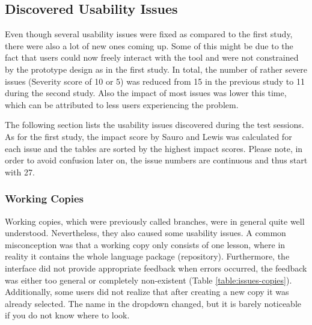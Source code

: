 \subsection{Discovered Usability Issues}
Even though several usability issues were fixed as compared to the first study, there were also a lot of new ones coming up. Some of this might be due to the fact that users could now freely interact with the tool and were not constrained by the prototype design as in the first study. In total, the number of rather severe issues (Severity score of 10 or 5)  was reduced from 15 in the previous study to 11 during the second study. Also the impact of most issues was lower this time, which can be attributed to less users experiencing the problem.

The following section lists the usability issues discovered during the test sessions. As for the first study, the impact score by Sauro and Lewis \cite{sauro_quantifying_2012} was calculated for each issue and the tables are sorted by the highest impact scores. Please note, in order to avoid confusion later on, the issue numbers are continuous and thus start with 27.


\subsubsection{Working Copies}
Working copies, which were previously called branches, were in general quite well understood. Nevertheless, they also caused some usability issues. A common misconception was that a working copy only consists of one lesson, where in reality it contains the whole language package (repository).
Furthermore, the interface did not provide appropriate feedback when errors occurred, the feedback was either too general or completely non-existent (Table \ref{table:issues-copies}). Additionally, some users did not realize that after creating a new copy it was already selected. The name in the dropdown changed, but it is barely noticeable if you do not know where to look.

